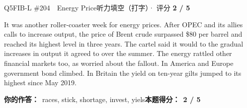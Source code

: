 \begin{qblock}{Q5\quad FIB-L \#204\ \ Energy Price}{听力填空（打字）· 评分 \textcolor{cAccent}{\bfseries 2 / 5}}
\begin{promptbox}
It was another roller-coaster week for energy prices. After OPEC and its allies  calls to increase output, the price of Brent crude surpassed \$80 per barrel and reached its highest level in three years. The cartel said it would  to the gradual increases in output it agreed to over the summer. The energy  rattled other financial markets too, as  worried about the fallout. In America and Europe government bond  climbed. In Britain the yield on ten-year gilts jumped to its highest since May 2019.
\end{promptbox}
\par\smallskip
\textbf{你的作答：}\ {\color{cWrong}races}, stick, shortage, {\color{cWrong}invest, yiels}\qquad\textbf{本题得分：}\ {\color{cAccent}\bfseries 2 / 5}
\end{qblock}

